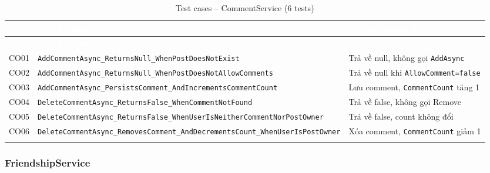\documentclass[a4paper]{article}
\begin{document}
\begin{longtable}{|C{0.8cm}|L{5.4cm}|L{7.4cm}|}
\hline
{}
\textcolor{white}{\textbf{ID}} &
\textcolor{white}{\textbf{Test Method}} &
\textcolor{white}{\textbf{Kết quả mong đợi}} \\
\hline
\endfirsthead
\hline
{}
\textcolor{white}{\textbf{ID}} &
\textcolor{white}{\textbf{Test Method}} &
\textcolor{white}{\textbf{Kết quả mong đợi}} \\
\hline
\endhead
\hline
\endfoot

CO01 & \texttt{AddCommentAsync\_ReturnsNull\_WhenPostDoesNotExist} & Trả về null, không gọi \texttt{AddAsync} \\
\hline
CO02 & \texttt{AddCommentAsync\_ReturnsNull\_WhenPostDoesNotAllowComments} & Trả về null khi \texttt{AllowComment=false} \\
\hline
{}
CO03 & \texttt{AddCommentAsync\_PersistsComment\_AndIncrementsCommentCount} & Lưu comment, \texttt{CommentCount} tăng 1 \\
\hline
CO04 & \texttt{DeleteCommentAsync\_ReturnsFalse\_WhenCommentNotFound} & Trả về false, không gọi Remove \\
\hline
{}
CO05 & \texttt{DeleteCommentAsync\_ReturnsFalse\_WhenUserIsNeitherCommentNorPostOwner} & Trả về false, count không đổi \\
\hline
CO06 & \texttt{DeleteCommentAsync\_RemovesComment\_AndDecrementsCount\_WhenUserIsPostOwner} & Xóa comment, \texttt{CommentCount} giảm 1 \\
\hline
\caption{Test cases -- CommentService (6 tests)}
\end{longtable}

\subsubsection{FriendshipService}
\end{document}
